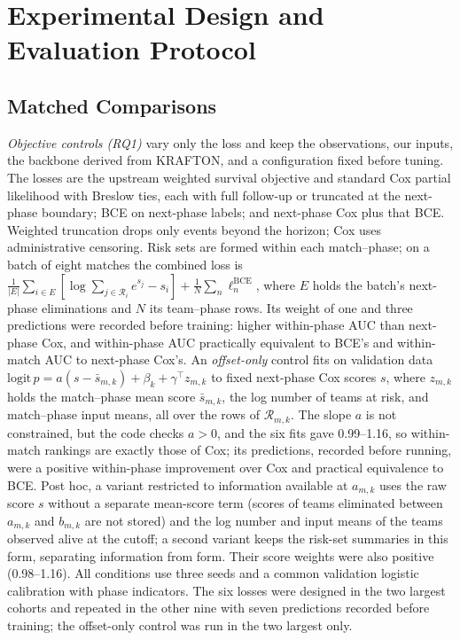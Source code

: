 \documentclass[sigconf,anonymous,nonacm]{acmart}
\begin{document}
\section{Experimental Design and Evaluation Protocol}
\label{sec:method:evaluation}
\subsection{Matched Comparisons}
\label{sec:method:decomposition}
\emph{Objective controls (RQ1)} vary only the loss and keep the observations, our inputs, the backbone derived from KRAFTON, and a configuration fixed before tuning. The losses are the upstream weighted survival objective and standard Cox partial likelihood with Breslow ties, each with full follow-up or truncated at the next-phase boundary; BCE on next-phase labels; and next-phase Cox plus that BCE. Weighted truncation drops only events beyond the horizon; Cox uses administrative censoring. Risk sets are formed within each match--phase; on a batch of eight matches the combined loss is $\frac{1}{|E|}\sum_{i\in E}[\log\sum_{j\in\mathcal{R}_i}e^{s_j}-s_i]+\frac{1}{N}\sum_{n}\ell^{\mathrm{BCE}}_n$, where $E$ holds the batch's next-phase eliminations and $N$ its team--phase rows. Its weight of one and three predictions were recorded before training: higher within-phase AUC than next-phase Cox, and within-phase AUC practically equivalent to BCE's and within-match AUC to next-phase Cox's. An \emph{offset-only} control fits on validation data $\mathrm{logit}\,p=a(s-\bar s_{m,k})+\beta_k+\gamma^{\top}z_{m,k}$ to fixed next-phase Cox scores $s$, where $z_{m,k}$ holds the match--phase mean score $\bar s_{m,k}$, the log number of teams at risk, and match--phase input means, all over the rows of $\mathcal{R}_{m,k}$. The slope $a$ is not constrained, but the code checks $a>0$, and the six fits gave 0.99--1.16, so within-match rankings are exactly those of Cox; its predictions, recorded before running, were a positive within-phase improvement over Cox and practical equivalence to BCE. Post hoc, a variant restricted to information available at $a_{m,k}$ uses the raw score $s$ without a separate mean-score term (scores of teams eliminated between $a_{m,k}$ and $b_{m,k}$ are not stored) and the log number and input means of the teams observed alive at the cutoff; a second variant keeps the risk-set summaries in this form, separating information from form. Their score weights were also positive (0.98--1.16). All conditions use three seeds and a common validation logistic calibration with phase indicators. The six losses were designed in the two largest cohorts and repeated in the other nine with seven predictions recorded before training; the offset-only control was run in the two largest only.
\end{document}
